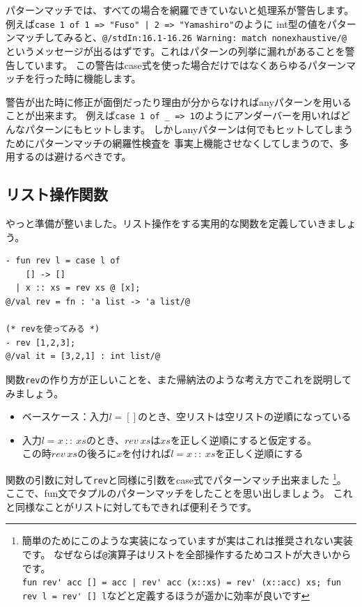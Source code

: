 \documentclass[11pt,a4paper]{article}
\begin{document}
パターンマッチでは、すべての場合を網羅できていないと処理系が警告します。\\
例えば\lstinline{case 1 of 1 => "Fuso" | 2 => "Yamashiro"}のように
int型の値をパターンマッチしてみると、\lstinline{@/stdIn:16.1-16.26 Warning: match nonexhaustive/@}
というメッセージが出るはずです。これはパターンの列挙に漏れがあることを警告しています。
この警告はcase式を使った場合だけではなくあらゆるパターンマッチを行った時に機能します。

警告が出た時に修正が面倒だったり理由が分からなければanyパターンを用いることが出来ます。
例えば\lstinline{case 1 of _ => 1}のようにアンダーバーを用いればどんなパターンにもヒットします。
しかしanyパターンは何でもヒットしてしまうためにパターンマッチの網羅性検査を
事実上機能させなくしてしまうので、多用するのは避けるべきです。

\subsection{リスト操作関数}

やっと準備が整いました。リスト操作をする実用的な関数を定義していきましょう。

\begin{lstlisting}[caption=リストを逆順にする関数revを定義する,label=code:rev1]
- fun rev l = case l of
    [] -> []
  | x :: xs = rev xs @ [x];
@/val rev = fn : 'a list -> 'a list/@

(* revを使ってみる *)
- rev [1,2,3];
@/val it = [3,2,1] : int list/@
\end{lstlisting}

関数\lstinline{rev}の作り方が正しいことを、また帰納法のような考え方でこれを説明してみましょう。
\begin{itemize}
\item ベースケース：入力$l=[]$のとき、空リストは空リストの逆順になっている
\item 入力$l = x \ :: \ xs$のとき、$rev \ xs$は$xs$を正しく逆順にすると仮定する。\\
  この時$rev \ xs$の後ろに$x$を付ければ$l = x \ :: \ xs$を正しく逆順にする
\end{itemize}

関数の引数に対して\lstinline{rev}と同様に引数をcase式でパターンマッチ出来ました
\footnote{簡単のためにこのような実装になっていますが実はこれは推奨されない実装です。
なぜならば\lstinline{@}演算子はリストを全部操作するためコストが大きいからです。\\
\lstinline{fun rev' acc [] = acc | rev' acc (x::xs) = rev' (x::acc) xs; fun rev l = rev' [] l}などと定義するほうが遥かに効率が良いです}。
ここで、fun文でタプルのパターンマッチをしたことを思い出しましょう。
これと同様なことがリストに対してもできれば便利そうです。
\end{document}
